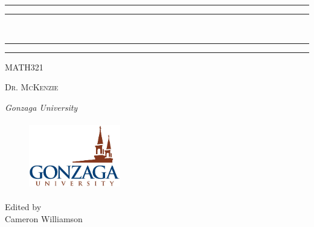 \begin{titlepage}
  \rule{\textwidth}{1.6pt}\vspace*{-\baselineskip}\vspace*{2pt} %
  \rule{\textwidth}{0.4pt} %
  
  \vspace{0.75\baselineskip} %
  
  {\huge {}\\} %
  
  \vspace{0.75\baselineskip} %
  
  \rule{\textwidth}{0.4pt}\vspace*{-\baselineskip}\vspace{3.2pt} %
  \rule{\textwidth}{1.6pt} %
  
  \vspace{2\baselineskip} %
  
  
  \LARGE{MATH321} 
  
  \vspace*{3\baselineskip} %
  
  
  
  \vspace{0.5\baselineskip} 
  
  {\scshape   \LARGE Dr. McKenzie\\ } %
  
  \vspace{0.2\baselineskip} 
  
  \textit{\Large Gonzaga University} 
  
  \vfill 
  
  
  \begin{figure}[!h]
      \centering
      \includegraphics[width = 4cm, height= 3cm]{resource/images/Gonzaga_University_Logo.jpg}%
  \end{figure}
  \vspace{0.3\baselineskip} 
  
  
  {\large Edited by\\  Cameron Williamson}
  \end{titlepage}